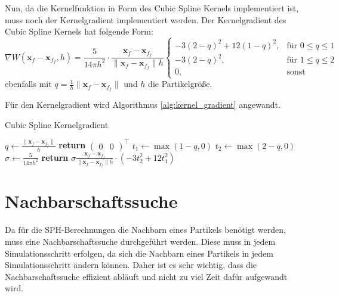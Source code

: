 \documentclass{scrreprt}
\begin{document}
Nun, da die Kernelfunktion in Form des Cubic Spline Kernels implementiert ist, muss noch der Kernelgradient implementiert werden.
Der Kernelgradient des Cubic Spline Kernels hat folgende Form:
\begin{equation}
    \nabla W(\textbf{x}_f - \textbf{x}_{f_f}, h) = \frac{5}{14\pi h^2} \cdot \frac{\textbf{x}_f - \textbf{x}_{f_f}}{\|\textbf{x}_f - \textbf{x}_{f_f}\| h} \begin{cases}
        -3(2-q)^2 + 12(1-q)^2, &\text{für } 0 \leq q \leq 1\\
        -3(2-q)^2, &\text{für } 1 \leq q \leq 2\\
        0, &\text{sonst}
    \end{cases}
\end{equation}
ebenfalls mit $q = \frac{1}{h}\|\textbf{x}_f - \textbf{x}_{f_f}\|$ und $h$ die Partikelgröße.

Für den Kernelgradient wird Algorithmus \ref{alg:kernel_gradient} angewandt.
\begin{algorithm}
    \caption{Cubic Spline Kernelgradient}
    \label{alg:kernel_gradient}
    \begin{algorithmic}[1]
            \State $q \gets \frac{\|\textbf{x}_f - \textbf{x}_{f_f}\|}{h}$
                \State \textbf{return} $\begin{pmatrix}0 & 0 \end{pmatrix}^\intercal$
            \EndIf
            \State $t_1 \gets \max(1 - q, 0)$
            \State $t_2 \gets \max(2 - q, 0)$
            \State $\sigma \gets \frac{5}{14 \pi h^2}$
            \State \textbf{return} $\sigma \frac{\textbf{x}_f - \textbf{x}_{f_f}}{\|\textbf{x}_f - \textbf{x}_{f_f}\| h} \cdot (-3 t_2^2 + 12t_1^2)$
        \EndFunction
    \end{algorithmic}
\end{algorithm}


\section{Nachbarschaftssuche}
Da für die SPH-Berechnungen die Nachbarn eines Partikels benötigt werden, muss eine Nachbarschaftssuche durchgeführt werden.
Diese muss in jedem Simulationsschritt erfolgen, da sich die Nachbarn eines Partikels in jedem Simulationsschritt ändern können.
Daher ist es sehr wichtig, dass die Nachbarschaftssuche effizient abläuft und nicht zu viel Zeit dafür aufgewandt wird.
\end{document}
